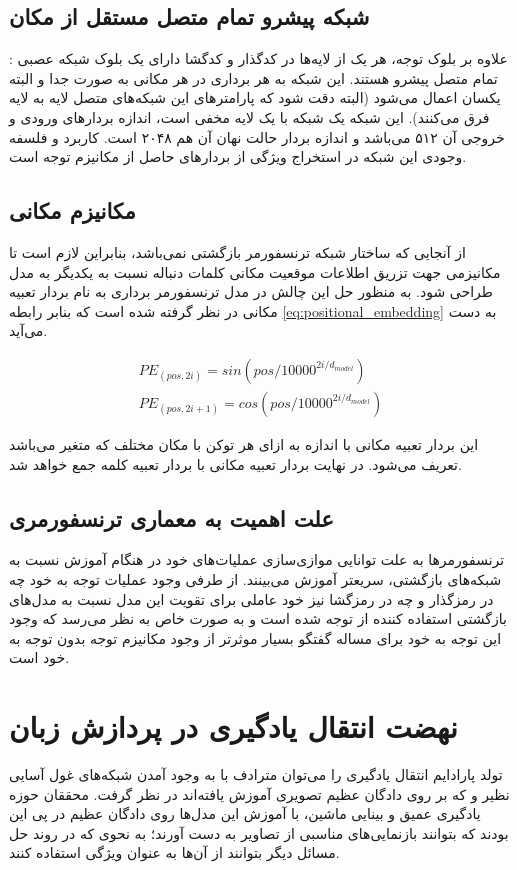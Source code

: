 \subsection{شبکه پیشرو تمام متصل مستقل از مکان}:
علاوه بر بلوک توجه، هر یک از لایه‌ها در کدگذار و کدگشا دارای یک بلوک شبکه عصبی تمام متصل پیشرو هستند. این شبکه به هر برداری در هر مکانی به صورت جدا و البته یکسان اعمال می‌شود (البته دقت شود که پارامتر‌های این شبکه‌های متصل لایه به لایه فرق می‌کنند). این شبکه یک شبکه با یک لایه مخفی است، اندازه بردارهای ورودی و خروجی آن ۵۱۲ می‌باشد و اندازه بردار حالت نهان آن هم ۲۰۴۸ است. کاربرد و فلسفه وجودی این شبکه در استخراج ویژگی از بردارهای حاصل از مکانیزم توجه است.


\subsection{
مکانیزم
مکانی
}
از آنجایی که ساختار شبکه ترنسفورمر بازگشتی نمی‌باشد، بنابراین لازم است تا مکانیزمی جهت تزریق اطلاعات موقعیت مکانی کلمات دنباله نسبت به یکدیگر به مدل طراحی شود. به منظور حل این چالش در مدل ترنسفورمر برداری به نام بردار تعبیه مکانی در نظر گرفته شده است که بنابر رابطه
\ref{eq:positional_embedding}
به دست می‌آید.

\begin{align} \label{eq:positional_embedding}
PE_{(pos, 2i)} = sin(pos/10000^{2i/d_{model}}) \\  \nonumber
PE_{(pos, 2i+1)} = cos(pos/10000^{2i/d_{model}}) 
\end{align}

این بردار تعبیه مکانی با اندازه 
 به ازای هر توکن با مکان مختلف که متغیر
می‌باشد تعریف می‌شود. در نهایت بردار تعبیه مکانی با بردار تعبیه کلمه جمع خواهد شد.

\subsection{علت اهمیت به معماری ترنسفورمری}
ترنسفورمر‌ها به علت توانایی موازی‌سازی عملیات‌های خود در هنگام آموزش نسبت به شبکه‌های بازگشتی، سریعتر آموزش می‌بینند. از طرفی وجود عملیات توجه به خود چه در رمزگذار و چه در رمزگشا نیز خود عاملی برای تقویت این مدل نسبت به مدل‌های بازگشتی استفاده کننده از توجه شده است و به صورت خاص به نظر می‌رسد که وجود این توجه به خود برای مساله گفتگو بسیار موثرتر از وجود مکانیزم توجه بدون توجه به خود است.

\section{نهضت انتقال یادگیری در پردازش زبان}
تولد پارادایم انتقال یادگیری را می‌توان مترادف با به وجود آمدن شبکه‌های غول آسایی نظیر
و
که بر روی دادگان عظیم تصویری آموزش یافته‌اند در نظر گرفت. محققان حوزه یادگیری عمیق و بینایی ماشین، با آموزش این مدل‌ها روی دادگان عظیم در پی این بودند که بتوانند بازنمایی‌های مناسبی از تصاویر به دست آورند؛ به نحوی که در روند حل مسائل دیگر بتوانند از آن‌ها به عنوان ویژگی‌ استفاده کنند. 

